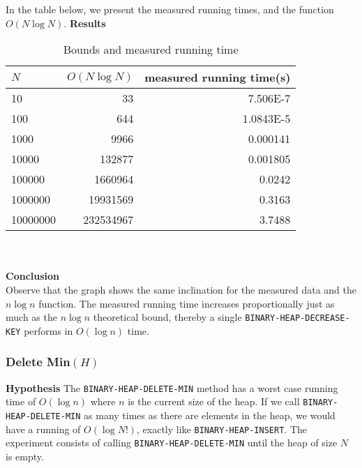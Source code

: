 \documentclass[a4paper,10pt]{article}
\begin{document}
In the table below, we present the measured running times, and the function $O(N\log N)$.
{\bf Results}
\begin{table}
  \begin{center}
    \begin{tabular}{l|r|r}
      $N$ & $O(N\log N)$ & measured running time(s)\\
      \hline
      10       & 33         & \num{7.506E-7}\\
      100      & 644        & \num{1.0843E-5}\\
      1000     & 9966       & \num{0.000141}\\
      10000    & 132877     & \num{0.001805}\\
      100000   & 1660964    & \num{0.0242}\\
      1000000  & 19931569   & \num{0.3163}\\
      10000000 & 232534967  & \num{3.7488}
    \end{tabular}
    \caption{Bounds and measured running time}
  \end{center}
\end{table}\\\\
{\bf Conclusion}\\
Observe that the graph shows the same inclination for the measured data and the $n\log n$ function. The measured running time increases proportionally just as much as the $n\log n$ theoretical bound, thereby a single \texttt{BINARY\--HEAP\--DECREASE\--KEY} performs in $O(\log n)$ time.

\subsubsection{Delete Min$(H)$}
{\bf Hypothesis}
The \texttt{BINARY\--HEAP\--DELETE\--MIN} method has a worst case running time of $O(\log n)$ where $n$ is the current size of the heap. If we call \texttt{BINARY\--HEAP\--DELETE\--MIN} as many times as there are elements in the heap, we would have a running of $O(\log N!)$, exactly like \texttt{BINARY\--HEAP\--INSERT}. The experiment consists of calling \texttt{BINARY\--HEAP\--DELETE\--MIN} until the heap of size $N$ is empty.
\end{document}

